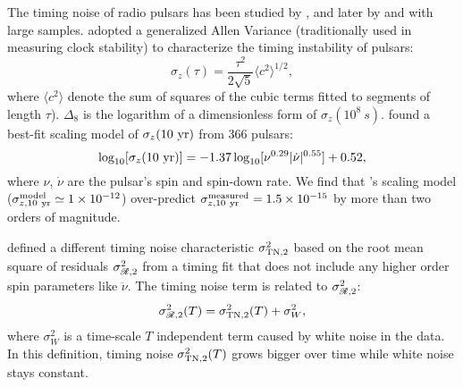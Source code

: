 The timing noise of radio pulsars has been studied by
\citet{ch80,cd85,antt94,dmhd95, mtem97}, and later by \citet{hlk10} and
\citet{sc10} with large samples. 
\citet{mtem97} adopted a generalized Allen Variance (traditionally used in
measuring clock stability) to characterize the timing instability of pulsars:
\begin{equation}
\label{eq:sigmaz}
\sigma_z(\tau) = \frac{\tau^2}{2\sqrt{5}}\langle c^2 \rangle^{1/2},
\end{equation}
where $\langle c^2\rangle$ denote the sum of squares of the cubic
terms fitted to segments of length $\tau$). 
$\Delta_8$ is the logarithm of a dimensionless form of $\sigma_z(10^8~s)$.
\citet{hlk10} found a best-fit scaling model of $\sigma_z({\rm 10~yr})$ 
from 366 pulsars:
\begin{equation}
\label{eq:hlk10}
\log_{10}[\sigma_z({\rm 10~yr})] =
-1.37\log_{10}[\nu^{0.29}|\dot{\nu}|^{0.55}]+0.52,
\end{equation} 
where $\nu$, $\dot{\nu}$ are the pulsar's spin and spin-down rate.
We find that \citet{hlk10}'s scaling model ($\sigma^{\rm model}_{z, \rm
10~yr}\simeq1\times10^{-12}$) over-predict $\sigma^{\rm measured}_{z, \rm
10~yr}=1.5\times10^{-15}$ by more than two orders of magnitude. 

\citet{ch80} defined a different timing noise characteristic $\sigma^2_{\rm
TN,2}$ based on the root mean square of residuals $\sigma^2_{\mathscr{R},2}$ from a
timing fit that does not include any higher order spin parameters like
$\ddot{\nu}$. 
The timing noise term is related to $\sigma^2_{\mathscr{R},2}$:
\begin{equation}
\sigma^2_{\mathscr{R},2}(T) = \sigma^2_{\rm TN,2}(T) + \sigma^2_W, 
\end{equation}
where $\sigma^2_W$ is a time-scale $T$ independent term caused by white 
noise in the data.
In this definition, timing noise $\sigma^2_{\rm TN,2}(T)$ grows bigger over
time while white noise stays constant.  

